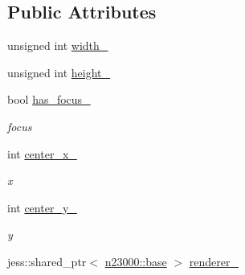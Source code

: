 \subsection*{Public Attributes}
\begin{DoxyCompactItemize}
\item 
unsigned int \hyperlink{classnebula_1_1platform_1_1window_1_1base_a6769bf7bc045cf361fc30cefb2fc9697}{width\_\-}
\item 
unsigned int \hyperlink{classnebula_1_1platform_1_1window_1_1base_a715501bdc4b96c2e70745935dfa6ec02}{height\_\-}
\item 
bool \hyperlink{classnebula_1_1platform_1_1window_1_1base_a02f6df954bf4e850c611a3296301f087}{has\_\-focus\_\-}
\begin{DoxyCompactList}\small\item\em focus \item\end{DoxyCompactList}\item 
int \hyperlink{classnebula_1_1platform_1_1window_1_1base_ac59776f251a4f2f39928d12dae0f1f13}{center\_\-x\_\-}
\begin{DoxyCompactList}\small\item\em x \item\end{DoxyCompactList}\item 
int \hyperlink{classnebula_1_1platform_1_1window_1_1base_aa28a2fe0192a3d4898df894a32e39ead}{center\_\-y\_\-}
\begin{DoxyCompactList}\small\item\em y \item\end{DoxyCompactList}\item 
jess::shared\_\-ptr$<$ \hyperlink{classnebula_1_1platform_1_1renderer_1_1base}{n23000::base} $>$ \hyperlink{classnebula_1_1platform_1_1window_1_1base_aadadee1e2f89111165948007fd40986b}{renderer\_\-}
\end{DoxyCompactItemize}
